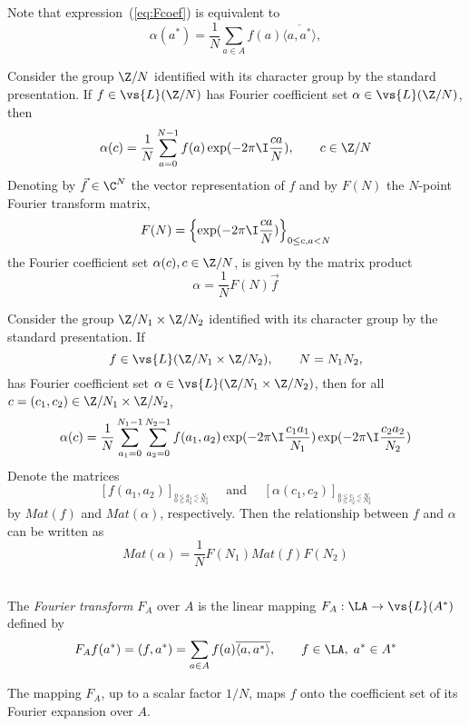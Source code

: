 Note that expression~(\ref{eq:Fcoef}) is equivalent to 
\[
\alpha(a^*) = \frac{1}{N}\sum_{a\in A} f(a)\overline{\langle a,a^*\rangle},
\]
\begin{example}\label{ex:FT}
Consider the group $\Z/N$ identified with its character group by the standard
presentation.  If $f\in \vs{L}(\Z/N)$ has Fourier coefficient set $\alpha \in
\vs{L}(\Z/N)$, then 
\[
\alpha(c) = \frac{1}{N}\sum_{a=0}^{N-1} f(a)
\exp(-2\pi \I \frac{ca}{N}),\qquad c\in \Z/N
\]
Denoting by $\vec{f} \in \C^N$ the vector representation of $f$ and by
$F(N)$ the $N$-point Fourier transform matrix,
\[
F(N) = \left\{ \exp(-2\pi \I \frac{ca}{N}) \right\}_{0\leq c,a < N}
\]
the Fourier coefficient set $\alpha(c), c\in \Z/N$, is given by the matrix
product
\[
\alpha = \frac{1}{N} F(N) \vec{f}
\]
\end{example}

\begin{example}\label{ex:FT2}
Consider the group $\Z/N_1 \times \Z/N_2$ identified with its character group
by the standard presentation.  If 
\[
f\in \vs{L}(\Z/N_1 \times \Z/N_2), \qquad N = N_1 N_2,
\]
has Fourier coefficient set $\alpha \in \vs{L}(\Z/N_1 \times \Z/N_2)$, then for all
$c = (c_1,c_2) \in \Z/N_1 \times \Z/N_2$, 
\[
\alpha(c) = \frac{1}{N}\sum_{a_1=0}^{N_1-1} 
\sum_{a_2=0}^{N_2-1} f(a_1,a_2)
\exp(-2\pi \I \frac{c_1a_1}{N_1})
\exp(-2\pi \I \frac{c_2a_2}{N_2})
\]
Denote the matrices
\[
\left[f(a_1,a_2) \right]_{\stackrel{0\leq a_1 < N_1}{_{0\leq a_2 < N_2}}} 
\quad \text{ and }\quad
\left[\alpha(c_1,c_2) \right]_{\stackrel{0\leq c_1 < N_1}{_{0\leq c_2 < N_2}}}
\]
by $Mat(f)$ and $Mat(\alpha)$, respectively.
Then the relationship between $f$ and $\alpha$ can be written as 
\[
Mat(\alpha) = \frac{1}{N} F(N_1) Mat(f) F(N_2)
\]
\end{example}

\begin{definition}\\
The \emph{Fourier transform} $F_A$ over $A$ is the linear mapping
$F_A : \LA \to \vs{L}(A^*)$
defined by
\[
F_A f(a^*) = (f,a^*) = \sum_{a\in A}f(a)\overline{\langle a, a^* \rangle},
\qquad f \in \LA, \;a^*\in A^*
\]
\end{definition}
The mapping $F_A$, up to a scalar factor $1/N$, maps $f$ onto the coefficient
set of its Fourier expansion over $A$.  

